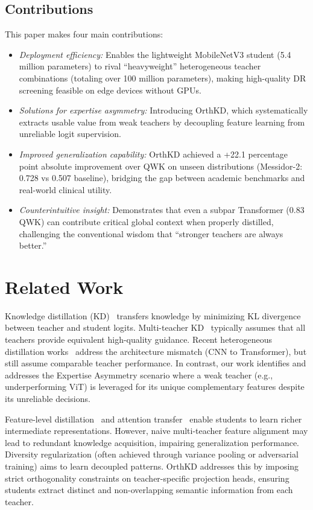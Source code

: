 \documentclass{article}
\begin{document}
\subsection{Contributions}
This paper makes four main contributions:
\begin{itemize}[leftmargin=*,itemsep=2pt,topsep=2pt]
    \item \textit{Deployment efficiency:} Enables the lightweight MobileNetV3 student (5.4 million parameters) to rival ``heavyweight'' heterogeneous teacher combinations (totaling over 100 million parameters), making high-quality DR screening feasible on edge devices without GPUs.
    \item \textit{Solutions for expertise asymmetry:} Introducing OrthKD, which systematically extracts usable value from weak teachers by decoupling feature learning from unreliable logit supervision.
    \item \textit{Improved generalization capability:} OrthKD achieved a +22.1 percentage point absolute improvement over QWK on unseen distributions (Messidor-2: 0.728 vs 0.507 baseline), bridging the gap between academic benchmarks and real-world clinical utility.
    \item \textit{Counterintuitive insight:} Demonstrates that even a subpar Transformer (0.83 QWK) can contribute critical global context when properly distilled, challenging the conventional wisdom that ``stronger teachers are always better.''
\end{itemize}

\section{Related Work}

Knowledge distillation (KD)~\cite{hinton2015distilling} transfers knowledge by minimizing KL divergence between teacher and student logits. Multi-teacher KD~\cite{you2017learning,mirzadeh2020improved} typically assumes that all teachers provide equivalent high-quality guidance. Recent heterogeneous distillation works~\cite{passalis2020heterogeneous} address the architecture mismatch (CNN to Transformer), but still assume comparable teacher performance. In contrast, our work identifies and addresses the Expertise Asymmetry scenario where a weak teacher (e.g., underperforming ViT) is leveraged for its unique complementary features despite its unreliable decisions.

Feature-level distillation~\cite{romero2014fitnets} and attention transfer~\cite{zagoruyko2016paying} enable students to learn richer intermediate representations. However, naive multi-teacher feature alignment may lead to redundant knowledge acquisition, impairing generalization performance. Diversity regularization (often achieved through variance pooling or adversarial training) aims to learn decoupled patterns. OrthKD addresses this by imposing strict orthogonality constraints on teacher-specific projection heads, ensuring students extract distinct and non-overlapping semantic information from each teacher.
\end{document}

